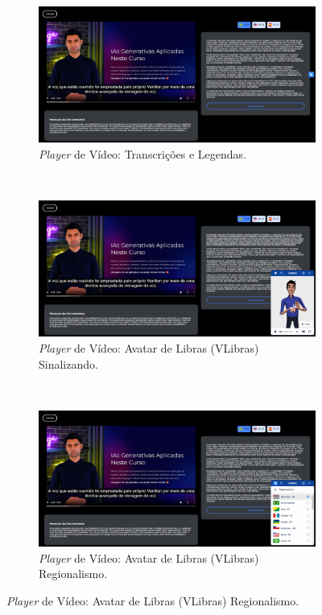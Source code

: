 \begin{figure}[htbp]
\centering
\caption{\textit{Screenshots} da Demo do \textit{Player} Apresentada no HICSS.}
\label{fig:chapter4-cs2-poc-demo}
\begin{subfigure}[b]{0.83\textwidth}
\centering
\includegraphics[width=\textwidth]{images/chapter4-cs2-poc-demo1.png}
\caption{\textit{Player} de Vídeo: Transcrições e Legendas.}
\label{fig:chapter4-cs2-poc-demo1}
\end{subfigure} ~
\begin{subfigure}[b]{0.83\textwidth}
\centering
\includegraphics[width=\textwidth]{images/chapter4-cs2-poc-demo2.png}
\caption{\textit{Player} de Vídeo: Avatar de Libras (VLibras) Sinalizando.}
\label{fig:chapter4-cs2-poc-demo2}
\end{subfigure} ~
\begin{subfigure}[b]{0.83\textwidth}
\centering
\includegraphics[width=\textwidth]{images/chapter4-cs2-poc-demo3.png}
\caption{\textit{Player} de Vídeo: Avatar de Libras (VLibras) Regionalismo.}
\label{fig:chapter4-cs2-poc-demo3}
\end{subfigure}
\fautor
\end{figure}

